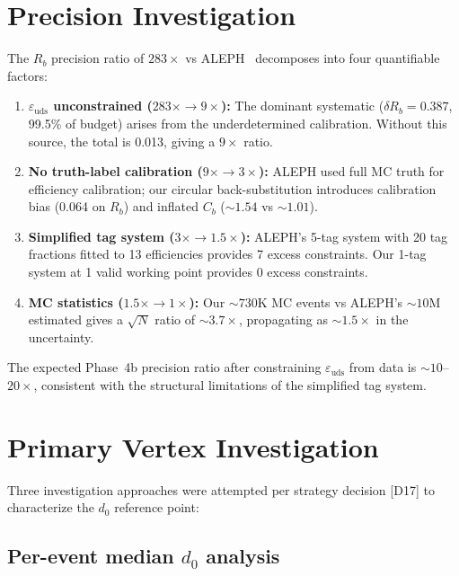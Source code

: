 \documentclass[11pt,a4paper]{article}
\begin{document}
\section{Precision Investigation}
\label{sec:precision_investigation}

The $R_b$ precision ratio of $283\times$ vs ALEPH~\cite{ALEPH:Rb:1996} decomposes
into four quantifiable factors:

\begin{enumerate}
\item \textbf{$\varepsilon_\mathrm{uds}$ unconstrained ($283\times \to 9\times$):}
The dominant systematic ($\delta R_b = 0.387$, 99.5\% of budget) arises from the
underdetermined calibration. Without this source, the total is 0.013, giving a
$9\times$ ratio.

\item \textbf{No truth-label calibration ($9\times \to 3\times$):} ALEPH used full
MC truth for efficiency calibration; our circular back-substitution introduces
calibration bias (0.064 on $R_b$) and inflated $C_b$ ($\sim 1.54$ vs $\sim 1.01$).

\item \textbf{Simplified tag system ($3\times \to 1.5\times$):} ALEPH's 5-tag system
with 20 tag fractions fitted to 13 efficiencies provides 7 excess constraints. Our
1-tag system at 1 valid working point provides 0 excess constraints.

\item \textbf{MC statistics ($1.5\times \to 1\times$):} Our $\sim 730$K MC events vs
ALEPH's $\sim 10$M estimated gives a $\sqrt{N}$ ratio of $\sim 3.7\times$,
propagating as $\sim 1.5\times$ in the uncertainty.
\end{enumerate}

The expected Phase~4b precision ratio after constraining $\varepsilon_\mathrm{uds}$
from data is $\sim 10$--$20\times$, consistent with the structural limitations
of the simplified tag system.

\section{Primary Vertex Investigation}
\label{app:vertex}

Three investigation approaches were attempted per strategy decision [D17] to
characterize the $d_0$ reference point:

\subsection{Per-event median $d_0$ analysis}
\end{document}
